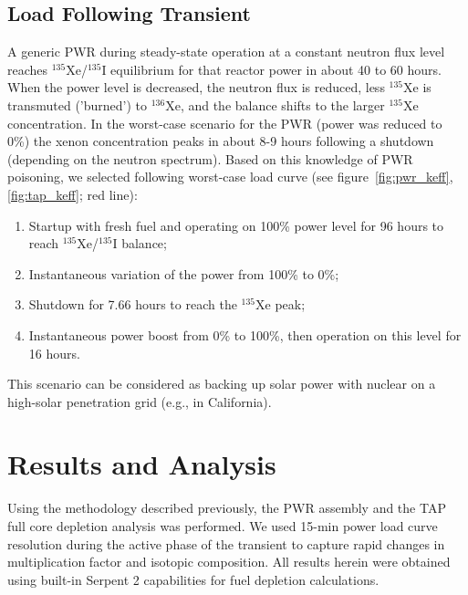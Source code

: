 \documentclass{anstrans}
\begin{document}
\subsection{Load Following Transient}
A generic \gls{PWR} during steady-state operation at a constant neutron flux 
level reaches $^{135}$Xe/$^{135}$I equilibrium for that reactor power in about 
40 to 60 hours. When the power level is decreased, the neutron flux is 
reduced, less $^{135}$Xe is transmuted ('burned') to $^{136}$Xe, and the 
balance shifts to the larger $^{135}$Xe concentration. In the worst-case 
scenario for the \gls{PWR} (power was reduced to 0\%) the xenon concentration 
peaks in about 8-9 hours following a shutdown (depending on the neutron 
spectrum). Based on this knowledge of \gls{PWR} poisoning, we selected 
following worst-case load curve (see figure~\ref{fig:pwr_keff}, 
\ref{fig:tap_keff}; red line):
\begin{enumerate}
	\item Startup with fresh fuel and operating on 
	100\% power level for 96 hours to reach $^{135}$Xe/$^{135}$I balance;
	\item Instantaneous variation of the power from 100\% to 0\%;
	\item Shutdown for 7.66 hours to reach the $^{135}$Xe peak;
	\item Instantaneous power boost from 0\% to 100\%, then operation on 
	this level for 16 hours.
\end{enumerate}
This scenario can be considered as backing up solar power with nuclear on a 
high-solar penetration grid (e.g., in California).

\section{Results and Analysis}
Using the methodology described previously, the \gls{PWR} assembly and 
the \gls{TAP} full core depletion analysis was performed. 
We used 15-min power load curve resolution during the active phase of the 
transient to capture rapid changes in multiplication factor and isotopic 
composition. All results herein were obtained using built-in Serpent 2 
capabilities for fuel depletion calculations.
\end{document}
